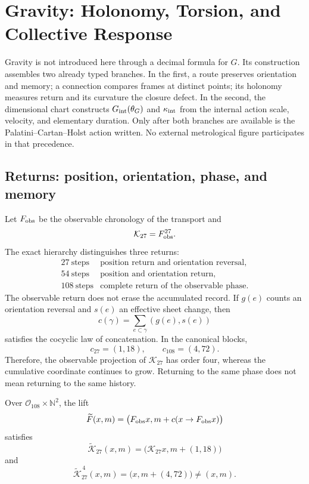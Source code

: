 \chapter{Gravity: Holonomy, Torsion, and Collective Response}
\label{chap:gravedad}

Gravity is not introduced here through a decimal formula for \(G\).
Its construction assembles two already typed branches. In the first, a route preserves
orientation and memory; a connection compares frames at distinct points; its
holonomy measures return and its curvature the closure defect. In the second,
the dimensional chart constructs \(G_{\rm int}(\theta_G)\) and
\(\kappa_{\rm int}\) from the internal action scale, velocity, and
elementary duration. Only after both branches are available is the
Palatini--Cartan--Holst action written. No external metrological figure participates in
that precedence.

\section{Returns: position, orientation, phase, and memory}

Let \(F_{\rm obs}\) be the observable chronology of the transport and
\[
 \mathcal K_{27}=F_{\rm obs}^{27}.
\]
The exact hierarchy distinguishes three returns:
\[
 \begin{array}{c|c}
 27\ \text{steps}&
 \text{position return and orientation reversal},\\
 54\ \text{steps}&
 \text{position and orientation return},\\
 108\ \text{steps}&
 \text{complete return of the observable phase}.
 \end{array}
\]
The observable return does not erase the accumulated record. If \(g(e)\) counts
an orientation reversal and \(s(e)\) an effective sheet change, then
\[
 c(\gamma)=\sum_{e\subset\gamma}(g(e),s(e))
\]
satisfies the cocyclic law of concatenation. In the canonical blocks,
\[
 c_{27}=(1,18),\qquad c_{108}=(4,72).
\]
Therefore, the observable projection of \(\mathcal K_{27}\) has order
four, whereas the cumulative coordinate continues to grow.  Returning to the
same phase does not mean returning to the same history.

\begin{theorem}
\label{thm:cobertura-retorno-grav-rev6}
Over \(\mathcal O_{108}\times\mathbb N^2\), the lift
\[
 \widetilde F(x,m)=
 \bigl(F_{\rm obs}x,m+c(x\to F_{\rm obs}x)\bigr)
\]
satisfies
\[
 \widetilde{\mathcal K}_{27}(x,m)
 =\bigl(\mathcal K_{27}x,m+(1,18)\bigr)
\]
and
\[
 \widetilde{\mathcal K}_{27}^{\,4}(x,m)
 =\bigl(x,m+(4,72)\bigr)\neq(x,m).
\]
\end{theorem}

